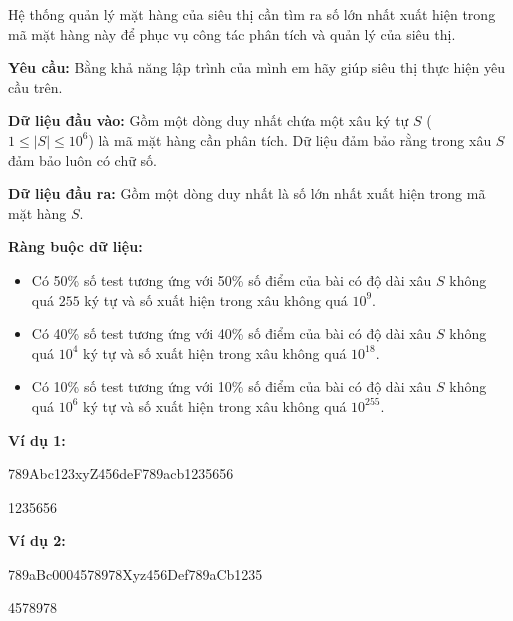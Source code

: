 \documentclass[12pt]{scrartcl}  %
\begin{document}
Hệ thống quản lý mặt hàng của siêu thị cần tìm ra số lớn nhất xuất hiện trong mã mặt hàng này để phục vụ công tác phân tích và quản lý của siêu thị.

\textbf{Yêu cầu:}
Bằng khả năng lập trình của mình em hãy giúp siêu thị thực hiện yêu cầu trên. 

\textbf{Dữ liệu đầu vào:}
Gồm một dòng duy nhất chứa một xâu ký tự $S$ ($1 \leq |S| \leq 10^6$) là mã mặt hàng cần phân tích. Dữ liệu đảm bảo rằng trong xâu $S$ đảm bảo luôn có chữ số. 

\textbf{Dữ liệu đầu ra:}
Gồm một dòng duy nhất là số lớn nhất xuất hiện trong mã mặt hàng $S$.

\textbf{Ràng buộc dữ liệu:}
\begin{itemize}
    \item Có 50\% số test tương ứng với 50\% số điểm của bài có độ dài xâu $S$ không quá $255$ ký tự và số xuất hiện trong xâu không quá $10^9$.
    \item Có 40\% số test tương ứng với 40\% số điểm của bài có độ dài xâu $S$ không quá $10^4$ ký tự và số xuất hiện trong xâu không quá $10^{18}$.
    \item Có 10\% số test tương ứng với 10\% số điểm của bài có độ dài xâu $S$ không quá $10^6$ ký tự và số xuất hiện trong xâu không quá $10^{255}$.
\end{itemize}

\textbf{Ví dụ 1:}
\begin{tcolorbox}[colback=gray!5!white, colframe=blue!50!black, title=Input]
789Abc123xyZ456deF789acb1235656
\end{tcolorbox}
\begin{tcolorbox}[colback=gray!5!white, colframe=green!50!black, title=Output]
1235656
\end{tcolorbox}

\textbf{Ví dụ 2:}
\begin{tcolorbox}[colback=gray!5!white, colframe=blue!50!black, title=Input]
789aBc0004578978Xyz456Def789aCb1235
\end{tcolorbox}
\begin{tcolorbox}[colback=gray!5!white, colframe=green!50!black, title=Output]
4578978
\end{tcolorbox}
\end{document}
